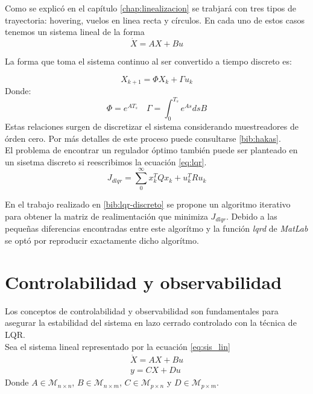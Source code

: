 \documentclass[main]{subfiles}
\begin{document}
Como se explic\'o en el cap\'itulo \ref{chap:linealizacion} se trabjar\'a con tres tipos de trayectoria: hovering, vuelos en linea recta y c\'irculos. En cada uno de estos casos tenemos un sistema lineal de la forma 
\begin{equation}
\dot{X} = A X + Bu
\end{equation}
 
La forma que toma el sistema continuo al ser convertido a tiempo discreto es: 

\begin{equation}
X_{k+1} = \Phi X_k + \Gamma u_k
\end{equation}
Donde:
\begin{equation}
\Phi = e^{AT_s} \quad \Gamma = \int_0^{T_s} e^{A s} ds B
\end{equation}
Estas relaciones surgen de discretizar el sistema considerando muestreadores de \'orden cero. Por m\'as detalles de este proceso puede consultarse \ref{bib:hakas}.\\

El problema de encontrar un regulador \'optimo tambi\'en puede ser planteado en un sisetma discreto si reescribimos la ecuaci\'on \ref{eq:lqr}. 
\begin{equation}
\label{eq:dlqr}
J_{dlqr} = \sum_0^\infty x_k^T Q x_k + u_k^T R u_k
\end{equation}

En el trabajo realizado en \ref{bib:lqr-discreto} se propone un algoritmo iterativo para obtener la matriz de realimentaci\'on que minimiza $J_{dlqr}$. Debido a las pequeñas diferencias encontradas entre este algor\'itmo y la funci\'on \emph{lqrd} de \emph{MatLab}  se opt\'o por reproducir exactamente dicho algor\'itmo.

\section{Controlabilidad y observabilidad}

Los conceptos de controlabilidad y observabilidad son fundamentales para asegurar la estabilidad del sistema en lazo cerrado controlado con la t\'ecnica de LQR.\\

Sea el sistema lineal representado por la ecuaci\'on \ref{eq:sis_lin}
\begin{equation}
\label{eq:sis_lin}
\begin{array}{c}
\dot{X} = AX+Bu \\
y = CX+Du
\end{array}
\end{equation}
Donde $A \in \mathcal{M}_{n \times n}$, $B \in \mathcal{M}_{n \times m}$, $C \in \mathcal{M}_{p \times n}$ y $D \in \mathcal{M}_{p \times m}$. 
\end{document}

